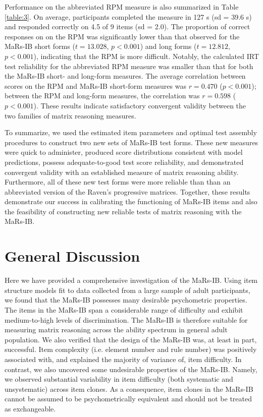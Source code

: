 \documentclass[a4paper,man,natbib,noextraspace]{apa6}
\begin{document}
Performance on the abbreviated RPM measure is also summarized in Table \ref{table:3}. On average, participants completed the measure in 127 s (sd = 39.6 s) and responded correctly on 4.5 of 9 items (sd = 2.0). The proportion of correct responses on on the RPM was significantly lower than that observed for the MaRs-IB short forms ($t = 13.028$, $p < 0.001$) and long forms ($t = 12.812$,  $p < 0.001$), indicating that the RPM is more difficult. Notably, the calculated IRT test reliability for the abbreviated RPM measure was smaller than that for both the MaRs-IB short- and long-form measures. The average correlation between scores on the RPM and MaRs-IB short-form measures was $r = 0.470$ ($p < 0.001$); between the RPM and long-form measures, the correlation was $r = 0.598$ ($p < 0.001$). These results indicate satisfactory convergent validity between the two families of matrix reasoning measures. 

To summarize, we used the estimated item parameters and optimal test assembly procedures to construct two new sets of MaRs-IB test forms. These new measures were quick to administer, produced score distributions consistent with model predictions, possess adequate-to-good test score reliability, and demonstrated convergent validity with an established measure of matrix reasoning ability. Furthermore, all of these new test forms were more reliable than than an abbreviated version of the Raven's progressive matrices. Together, these results demonstrate our success in calibrating the functioning of MaRs-IB items and also the feasibility of constructing new reliable tests of matrix reasoning with the MaRs-IB.

\section{General Discussion}

Here we have provided a comprehensive investigation of the MaRs-IB. Using item structure models fit to data collected from a large sample of adult participants, we found that the MaRs-IB possesses many desirable psychometric properties. The items in the MaRs-IB span a considerable range of difficulty and exhibit medium-to-high levels of discrimination. The MaRs-IB is therefore suitable for measuring matrix reasoning across the ability spectrum in general adult population. We also verified that the design of the MaRs-IB was, at least in part, successful. Item complexity (i.e. element number and rule number) was positively associated with, and explained the majority of variance of, item difficulty. In contrast, we also uncovered some undesirable properties of the MaRs-IB. Namely, we observed substantial variability in item difficulty (both systematic and unsystematic) across item clones. As a consequence, item clones in the MaRs-IB cannot be assumed to be psychometrically equivalent and should not be treated as exchangeable.
\end{document}
